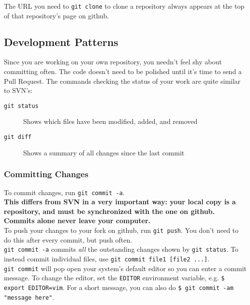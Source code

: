 \documentclass{article}
\begin{document}
The URL you need to {\tt git clone} to clone a repository always appears at the top of that repository's page on github.

\subsection{Development Patterns}
\label{patterns}
Since you are working on your own repository, you needn't feel shy about committing often. The code doesn't need to be polished until it's time to send a Pull Request. The commands checking the status of your work are quite similar to SVN's:
\begin{description}
\item[{\tt git status}] Shows which files have been modified, added, and removed
\item[{\tt git diff}] Shows a summary of all changes since the last commit
\end{description}

\subsubsection{Committing Changes}
To commit changes, run  {\tt git commit -a}.\\

{\bf This differs from SVN in a very important way: your local copy is a repository, and must be synchronized with the one on github. Commits alone never leave your computer.}\\

To push your changes to your fork on github, run {\tt git push}. You don't need to do this after every commit, but push often.\\

{\tt git commit -a} commits {\it all} the outstanding changes shown by {\tt git status}. To instead commit individual files, use {\tt git commit file1 [file2 ...]}.\\

{\tt git commit} will pop open your system's default editor so you can enter a commit message. To change the editor, set the {\tt EDITOR} environment variable, e.g. {\tt \$ export EDITOR=vim}. For a short message, you can also do {\tt \$ git commit -am "message here"}.
\end{document}
